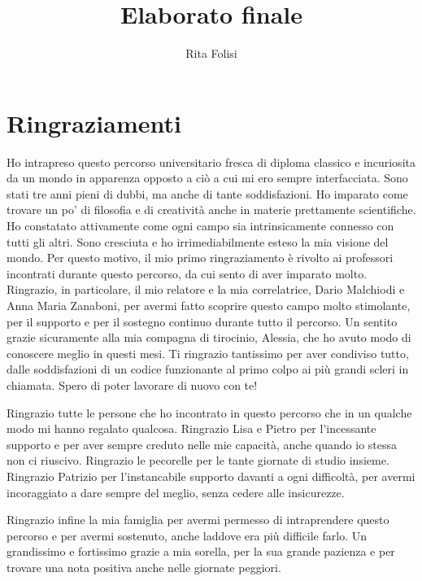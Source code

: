 \documentclass[11pt,  oneside, openany]{book}
\title{Elaborato finale}
\date{}
\author{Rita Folisi}
\begin{document}

  \begin{titlepage}
    
    \thispagestyle{empty}
  \end{titlepage}




	\chapter*{Ringraziamenti}
Ho intrapreso questo percorso universitario fresca di diploma classico e incuriosita da un mondo in apparenza opposto a ciò a cui mi ero sempre interfacciata. Sono stati tre anni pieni di dubbi, ma anche di tante soddisfazioni. Ho imparato come trovare un po' di filosofia e di creatività anche in materie prettamente scientifiche. Ho constatato attivamente come ogni campo sia intrinsicamente connesso con tutti gli altri. Sono cresciuta e ho irrimediabilmente esteso la mia visione del mondo. Per questo motivo, il mio primo ringraziamento è rivolto ai professori incontrati durante questo percorso, da cui sento di aver imparato molto. Ringrazio, in particolare, il mio relatore e la mia correlatrice, Dario Malchiodi e Anna Maria Zanaboni, per avermi fatto scoprire questo campo molto stimolante, per il supporto e per il sostegno continuo durante tutto il percorso. Un sentito grazie sicuramente alla mia compagna di tirocinio, Alessia, che ho avuto modo di conoscere meglio in questi mesi. Ti ringrazio tantissimo per aver condiviso tutto, dalle soddisfazioni di un codice funzionante al primo colpo ai più grandi scleri in chiamata. Spero di poter lavorare di nuovo con te! 

Ringrazio tutte le persone che ho incontrato in questo percorso che in un qualche modo mi hanno regalato qualcosa. Ringrazio Lisa e Pietro per l'incessante supporto e per aver sempre creduto nelle mie capacità, anche quando io stessa non ci riuscivo. Ringrazio le pecorelle per le tante giornate di studio insieme. Ringrazio Patrizio per l'instancabile supporto davanti a ogni difficoltà, per avermi incoraggiato a dare sempre del meglio, senza cedere alle insicurezze. 

Ringrazio infine la mia famiglia per avermi permesso di intraprendere questo percorso e per avermi sostenuto, anche laddove era più difficile farlo. Un grandissimo e fortissimo grazie a mia sorella, per la sua grande pazienza e per trovare una nota positiva anche nelle giornate peggiori. 
\end{document}
